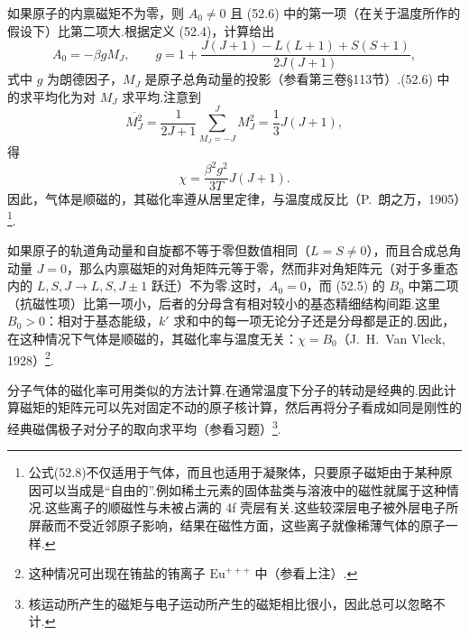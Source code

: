 如果原子的内禀磁矩不为零，则 $A_0\neq0$ 且 (52.6) 中的第一项（在关于温度所作的假设下）比第二项大.根据定义 (52.4)，计算给出
\begin{equation*}
  A_0=-\beta gM_J,\qquad
  g=1+\frac{J(J+1)-L(L+1)+S(S+1)}{2J(J+1)},
\end{equation*}
式中 $g$ 为朗德因子，$M_J$ 是原子总角动量的投影（参看第三卷§113节）.(52.6) 中的求平均化为对 $M_J$ 求平均.注意到
\begin{equation*}
  \overline{M_J^2}=\frac{1}{2J+1}\sum_{M_J=-J}^{J}M_J^2
  =\frac{1}{3}J(J+1),
\end{equation*}
得
\begin{equation}
  \chi=\frac{\beta^2g^2}{3T}J(J+1).
\end{equation}
因此，气体是顺磁的，其磁化率遵从居里定律，与温度成反比（P.~朗之万，1905）\footnote{公式(52.8)不仅适用于气体，而且也适用于凝聚体，只要原子磁矩由于某种原因可以当成是“自由的”.例如稀土元素的固体盐类与溶液中的磁性就属于这种情况.这些离子的顺磁性与未被占满的 4f 壳层有关.这些较深层电子被外层电子所屏蔽而不受近邻原子影响，结果在磁性方面，这些离子就像稀薄气体的原子一样.}.

如果原子的轨道角动量和自旋都不等于零但数值相同（$L=S\neq0$），而且合成总角动量 $J=0$，那么内禀磁矩的对角矩阵元等于零，然而非对角矩阵元（对于多重态内的 $L,S,J\to L,S,J\pm1$ 跃迁）不为零.这时，$A_0=0$，而 (52.5) 的 $B_0$ 中第二项（抗磁性项）比第一项小，后者的分母含有相对较小的基态精细结构间距.这里 $B_0>0$：相对于基态能级，$k'$ 求和中的每一项无论分子还是分母都是正的.因此，在这种情况下气体是顺磁的，其磁化率与温度无关：$\chi=B_0$（J.~H.~Van Vleck, 1928）\footnote{这种情况可出现在铕盐的铕离子 $\mathrm{Eu}^{+++}$ 中（参看上注）.}.

分子气体的磁化率可用类似的方法计算.在通常温度下分子的转动是经典的.因此计算磁矩的矩阵元可以先对固定不动的原子核计算，然后再将分子看成如同是刚性的经典磁偶极子对分子的取向求平均（参看习题）\footnote{核运动所产生的磁矩与电子运动所产生的磁矩相比很小，因此总可以忽略不计.}.


